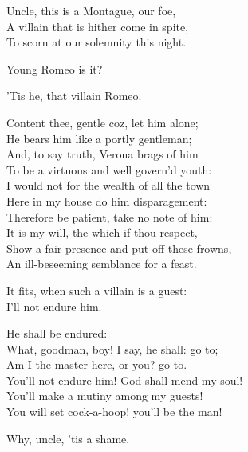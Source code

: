 \begin{speech}
Uncle, this is a Montague, our foe, \\
A villain that is hither come in spite, \\
To scorn at our solemnity this night. \\
\end{speech}
\begin{speech}
Young Romeo is it? \\
\end{speech}
\begin{speech}
'Tis he, that villain Romeo. \\
\end{speech}
\begin{speech}
Content thee, gentle coz, let him alone; \\
He bears him like a portly gentleman; \\
And, to say truth, Verona brags of him \\
To be a virtuous and well govern'd youth: \\
I would not for the wealth of all the town \\
Here in my house do him disparagement: \\
Therefore be patient, take no note of him: \\
It is my will, the which if thou respect, \\
Show a fair presence and put off these frowns, \\
An ill-beseeming semblance for a feast. \\
\end{speech}
\begin{speech}
It fits, when such a villain is a guest: \\
I'll not endure him. \\
\end{speech}
\begin{speech}
He shall be endured: \\
What, goodman, boy! I say, he shall: go to; \\
Am I the master here, or you? go to. \\
You'll not endure him!   God shall mend my soul! \\
You'll make a mutiny among my guests! \\
You will set cock-a-hoop!   you'll be the man! \\
\end{speech}
\begin{speech}
Why, uncle, 'tis a shame. \\
\end{speech}
